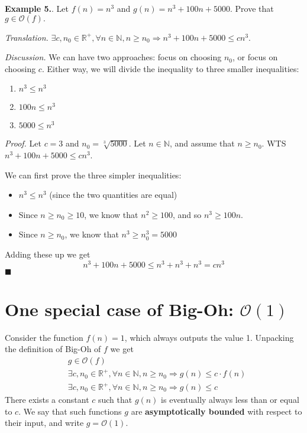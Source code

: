 \documentclass{article}
\newcommand\qedsymbol{\hfill$\blacksquare$}
\newcounter{excount}
\newcommand\ex{\stepcounter{excount} \textbf{Example 5.\theexcount}. }
\begin{document}
\ex Let $f ( n) = n^3$ and $g(n) = n^3 + 100n +5000$. Prove that $g \in 
\mathcal{O} (f). $

\textit{Translation.} $\exists c, n_0 \in \mathbb{R}^+, \forall n \in \mathbb{N}, 
n \geq n_0 \Rightarrow n^3 + 100n + 5000 \leq cn^3$.

\textit{Discussion.} We can have two approaches: focus on choosing $n_0$, or 
focus on choosing $c$. Either way, we will divide the inequality to three 
smaller inequalities: 
\begin{enumerate}
    \item $n^3 \leq n^3$
    \item $100n \leq n^3$
    \item $5000 \leq n^3$
\end{enumerate}

\textit{Proof.} Let $c = 3$ and $n_0 = \sqrt[3] {5000}$. Let $n \in \mathbb{N}$, 
and assume that $n \geq n_0$. WTS $n^3 + 100 n + 5000 \leq cn^3$. 

We can first prove the three simpler inequalities: 
\begin{itemize}
    \item $n^3 \leq n^3$ (since the two quantities are equal)
    \item Since $n \geq n_0 \geq 10$, we know that $n^2 \geq 100$, and so $n^3 \geq 100n $.
    \item Since $n \geq n_0$, we know that $n^3 \geq n^3_0 = 5000$
\end{itemize}
Adding these up we get 
$$n ^3 + 100 n + 5000 \leq n^3 + n^3 + n^3 = cn^3$$
\qedsymbol

\newpage
\section{One special case of Big-Oh: $\mathcal{O} (1)$}
Consider the function $f ( n) = 1$, which always outputs the value 1. Unpacking 
the definition of Big-Oh of $f$ we get
\begin{align*}
    &g \in \mathcal{O} (f) \\
    &\exists c, n_0 \in \mathbb{R}^+ , \forall n \in \mathbb{N}, n \geq n_0 
    \Rightarrow g (n) \leq c \cdot f ( n) \\ 
    &\exists c, n_0 \in \mathbb{R}^+ , \forall n \in \mathbb{N}, n \geq n_0 
    \Rightarrow g(n) \leq c \tag*{since $f (n) =1$}
\end{align*}
There exists a constant $c$ such that $g (n) $ is eventually always less than 
or equal to $c$. We say that such functions $g$ are \textbf{asymptotically 
bounded} with respect to their input, and write $g = \mathcal{O} (1) $.
\end{document}
